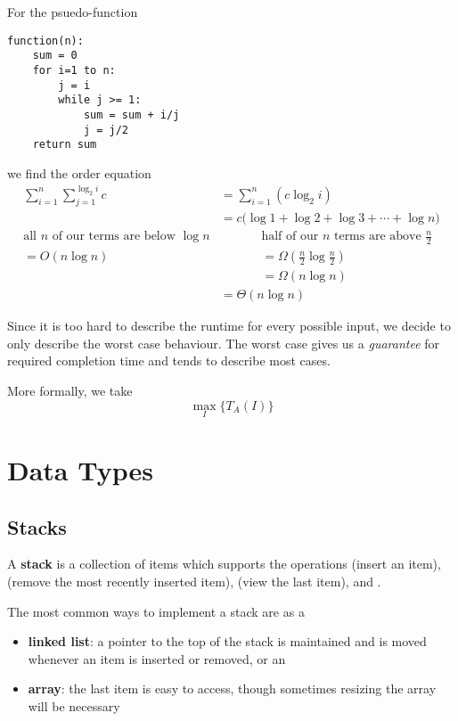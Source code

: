 \documentclass[12pt]{article}
\begin{document}
\begin{example}
For the psuedo-function
\begin{verbatim}
function(n):
    sum = 0
    for i=1 to n:
        j = i
        while j >= 1:
            sum = sum + i/j
            j = j/2
    return sum
\end{verbatim}
we find the order equation
\begin{align*}
\sum_{i=1}^n \sum_{j=1}^{\log_2 i} c &= \sum_{i=1}^n (c \log_2 i)\\
&= c\bigl(\log 1 + \log 2 + \log 3 + \cdots + \log n\bigl)\\
\text{all }n\text{ of our terms are below }\log n &\hspace{40pt} \text{half of our }n\text{ terms are above }\frac{n}{2}\\
= O(n\log n) &\hspace{40pt}= \Omega(\frac{n}{2}\log\frac{n}{2})\\
&\hspace{40pt}= \Omega(n\log n)\\
&= \Theta(n\log n)
\end{align*}
\end{example}

Since it is too hard to describe the runtime for every possible input, we decide to only describe the worst case behaviour. The worst case gives us a \emph{guarantee} for required completion time and tends to describe most cases.

More formally, we take \[ \max_{I} \{T_A(I)\} \]

\section{Data Types}
\subsection{Stacks}
A {\bf stack} is a collection of items which supports the operations  (insert an item),  (remove the most recently inserted item),  (view the last item), and .

The most common ways to implement a stack are as a
\begin{itemize}
\item {\bf linked list}: a pointer to the top of the stack is maintained and is moved whenever an item is inserted or removed, or an
\item {\bf array}: the last item is easy to access, though sometimes resizing the array will be necessary
\end{itemize}
\end{document}
